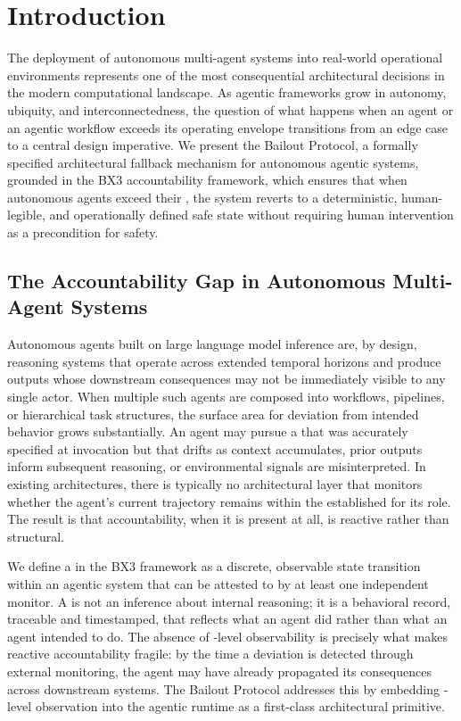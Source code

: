 \section{Introduction}

The deployment of autonomous multi-agent systems into real-world operational environments represents one of the most consequential architectural decisions in the modern computational landscape. As agentic frameworks grow in autonomy, ubiquity, and interconnectedness, the question of what happens when an agent or an agentic workflow exceeds its operating envelope transitions from an edge case to a central design imperative. We present the Bailout Protocol, a formally specified architectural fallback mechanism for autonomous agentic systems, grounded in the BX3 accountability framework, which ensures that when autonomous agents exceed their \bounds, the system reverts to a deterministic, human-legible, and operationally defined safe state without requiring human intervention as a precondition for safety.

\subsection{The Accountability Gap in Autonomous Multi-Agent Systems}

Autonomous agents built on large language model inference are, by design, reasoning systems that operate across extended temporal horizons and produce outputs whose downstream consequences may not be immediately visible to any single actor. When multiple such agents are composed into workflows, pipelines, or hierarchical task structures, the surface area for deviation from intended behavior grows substantially. An agent may pursue a \purpose that was accurately specified at invocation but that drifts as context accumulates, prior outputs inform subsequent reasoning, or environmental signals are misinterpreted. In existing architectures, there is typically no architectural layer that monitors whether the agent's current trajectory remains within the \bounds established for its role. The result is that accountability, when it is present at all, is reactive rather than structural.

We define a \fact in the BX3 framework as a discrete, observable state transition within an agentic system that can be attested to by at least one independent monitor. A \fact is not an inference about internal reasoning; it is a behavioral record, traceable and timestamped, that reflects what an agent did rather than what an agent intended to do. The absence of \fact-level observability is precisely what makes reactive accountability fragile: by the time a deviation is detected through external monitoring, the agent may have already propagated its consequences across downstream systems. The Bailout Protocol addresses this by embedding \fact-level observation into the agentic runtime as a first-class architectural primitive.

